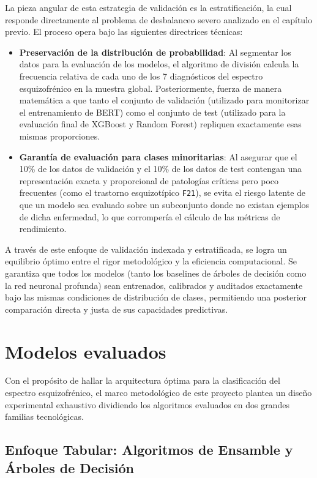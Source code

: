 \documentclass[12pt,a4paper,onecolumn,oneside]{report}
\begin{document}
La pieza angular de esta estrategia de validación es la estratificación, la cual responde directamente al problema de desbalanceo severo analizado en el capítulo previo. El proceso opera bajo las siguientes directrices técnicas:
\begin{itemize}
    \item \textbf{Preservación de la distribución de probabilidad}: Al segmentar los datos para la evaluación de los modelos, el algoritmo de división calcula la frecuencia relativa de cada uno de los 7 diagnósticos del espectro esquizofrénico en la muestra global. Posteriormente, fuerza de manera matemática a que tanto el conjunto de validación (utilizado para monitorizar el entrenamiento de BERT) como el conjunto de test (utilizado para la evaluación final de XGBoost y Random Forest) repliquen exactamente esas mismas proporciones.
    \item \textbf{Garantía de evaluación para clases minoritarias}: Al asegurar que el 10\% de los datos de validación y el 10\% de los datos de test contengan una representación exacta y proporcional de patologías críticas pero poco frecuentes (como el trastorno esquizotípico \texttt{F21}), se evita el riesgo latente de que un modelo sea evaluado sobre un subconjunto donde no existan ejemplos de dicha enfermedad, lo que corrompería el cálculo de las métricas de rendimiento.
\end{itemize}

A través de este enfoque de validación indexada y estratificada, se logra un equilibrio óptimo entre el rigor metodológico y la eficiencia computacional. Se garantiza que todos los modelos (tanto los baselines de árboles de decisión como la red neuronal profunda) sean entrenados, calibrados y auditados exactamente bajo las mismas condiciones de distribución de clases, permitiendo una posterior comparación directa y justa de sus capacidades predictivas.

\section{Modelos evaluados}

Con el propósito de hallar la arquitectura óptima para la clasificación del espectro esquizofrénico, el marco metodológico de este proyecto plantea un diseño experimental exhaustivo dividiendo los algoritmos evaluados en dos grandes familias tecnológicas.

\subsection{Enfoque Tabular: Algoritmos de Ensamble y Árboles de Decisión}
\end{document}
